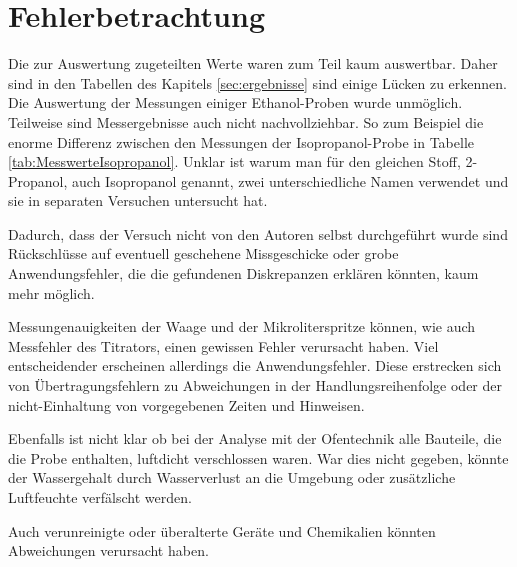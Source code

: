 \section{Fehlerbetrachtung}
\label{sec:fehler}

Die zur Auswertung zugeteilten Werte waren zum Teil kaum auswertbar. Daher sind in den Tabellen des Kapitels \ref{sec:ergebnisse} sind einige Lücken zu erkennen. Die Auswertung der Messungen einiger Ethanol-Proben wurde unmöglich. Teilweise sind Messergebnisse auch nicht nachvollziehbar. So zum Beispiel die enorme Differenz zwischen den Messungen der Isopropanol-Probe in Tabelle \ref{tab:MesswerteIsopropanol}. Unklar ist warum man für den gleichen Stoff, 2-Propanol, auch Isopropanol genannt, zwei unterschiedliche Namen verwendet und sie in separaten Versuchen untersucht hat. 

Dadurch, dass der Versuch nicht von den Autoren selbst durchgeführt wurde sind Rückschlüsse auf eventuell geschehene Missgeschicke oder grobe Anwendungsfehler, die die gefundenen Diskrepanzen erklären könnten, kaum mehr möglich. 

Messungenauigkeiten der Waage und der Mikroliterspritze können, wie auch Messfehler des Titrators, einen gewissen Fehler verursacht haben. Viel entscheidender erscheinen allerdings die Anwendungsfehler. Diese erstrecken sich von Übertragungsfehlern zu Abweichungen in der Handlungsreihenfolge oder der nicht-Einhaltung von vorgegebenen Zeiten und Hinweisen.

Ebenfalls ist nicht klar ob bei der Analyse mit der Ofentechnik alle Bauteile, die die Probe enthalten, luftdicht verschlossen waren. War dies nicht gegeben, könnte der Wassergehalt durch Wasserverlust an die Umgebung oder zusätzliche Luftfeuchte verfälscht werden.

Auch verunreinigte oder überalterte Geräte und Chemikalien könnten Abweichungen verursacht haben.